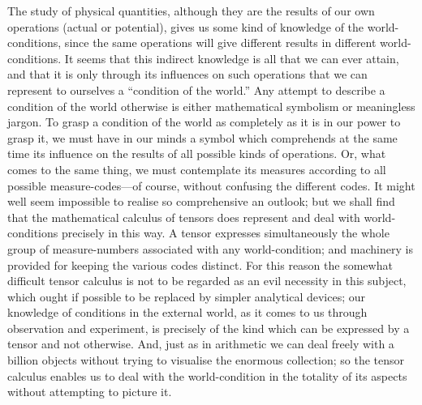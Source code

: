 \documentclass[12pt]{book}
\begin{document}
The study of physical quantities, although they are the results of our
%
own operations (actual or potential), gives us some kind of knowledge of the
world-conditions, since the same operations will give different results in
different world-conditions. It seems that this indirect knowledge is all that
we can ever attain, and that it is only through its influences on such operations
that we can represent to ourselves a ``condition of the world.'' Any
%
attempt to describe a condition of the world otherwise is either mathematical
symbolism or meaningless jargon. To grasp a condition of the world as
completely as it is in our power to grasp it, we must have in our minds a
symbol which comprehends at the same time its influence on the results of
all possible kinds of operations. Or, what comes to the same thing, we must
contemplate its measures according to all possible measure-codes---of course,
without confusing the different codes. It might well seem impossible to
realise so comprehensive an outlook; but we shall find that the mathematical
calculus of tensors does represent and deal with world-conditions precisely in
this way. A tensor expresses simultaneously the whole group of measure-numbers
associated with any world-condition; and machinery is provided for
keeping the various codes distinct. For this reason the somewhat difficult
tensor calculus is not to be regarded as an evil necessity in this subject, which
ought if possible to be replaced by simpler analytical devices; our knowledge
of conditions in the external world, as it comes to us through observation and
experiment, is precisely of the kind which can be expressed by a tensor and
not otherwise. And, just as in arithmetic we can deal freely with a billion
objects without trying to visualise the enormous collection; so the tensor
calculus enables us to deal with the world-condition in the totality of its
aspects without attempting to picture it.
\end{document}
